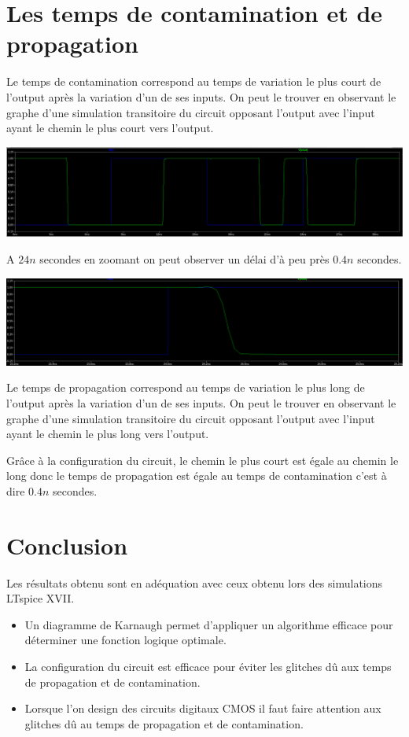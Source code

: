 \documentclass{homeworg}
\begin{document}
\section{Les temps de contamination et de propagation}
Le temps de contamination correspond au temps de variation le plus court de l'output après la variation d'un de ses inputs.
On peut le trouver en observant le graphe d'une simulation transitoire du circuit opposant l'output avec l'input ayant le chemin le plus court vers l'output.
\begin{center}
    \includegraphics[scale=0.31]{timing_a.png}
\end{center}
A $24n$ secondes en zoomant on peut observer un délai d'à peu près $0.4n$ secondes.
\begin{center}
    \includegraphics[scale=0.31]{timing_b.png}
\end{center}
Le temps de propagation correspond au temps de variation le plus long de l'output après la variation d'un de ses inputs.
On peut le trouver en observant le graphe d'une simulation transitoire du circuit opposant l'output avec l'input ayant le chemin le plus long vers l'output.

Grâce à la configuration du circuit, le chemin le plus court est égale au chemin le long donc le temps de propagation est égale au temps de contamination c'est à dire $0.4n$ secondes.
\newpage

\section{Conclusion}
Les résultats obtenu sont en adéquation avec ceux obtenu lors des simulations LTspice XVII.
\begin{itemize}
    \item Un diagramme de Karnaugh permet d'appliquer un algorithme efficace pour déterminer une fonction logique optimale.
    \item La configuration du circuit est efficace pour éviter les glitches dû aux temps de propagation et de contamination.
    \item Lorsque l'on design des circuits digitaux CMOS il faut faire attention aux glitches dû au temps de propagation et de contamination.
\end{itemize}
\end{document}

